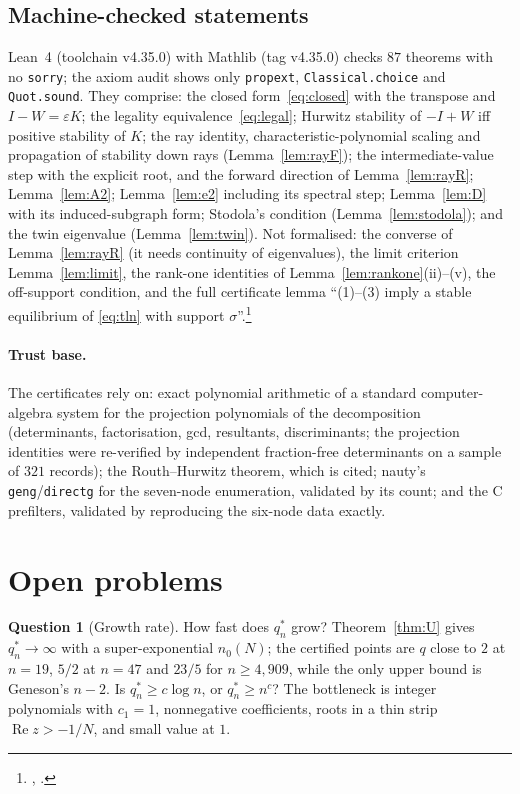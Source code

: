 \documentclass[11pt]{article}
\theoremstyle{definition}
\newtheorem{question}[theorem]{Question}
\newcommand{\eps}{\varepsilon}
\newcommand{\Rea}{\operatorname{Re}}
\begin{document}
\subsection{Machine-checked statements}
Lean~4 (toolchain v4.35.0) with Mathlib (tag v4.35.0) checks $87$ theorems with no \texttt{sorry}; the axiom audit shows only
\texttt{propext}, \texttt{Classical.choice} and \texttt{Quot.sound}. They comprise: the closed form~\eqref{eq:closed} with the
transpose and $I-W=\eps K$; the legality equivalence~\eqref{eq:legal}; Hurwitz stability of $-I+W$ iff positive stability of $K$;
the ray identity, characteristic-polynomial scaling and propagation of stability down rays (Lemma~\ref{lem:rayF}); the
intermediate-value step with the explicit root, and the forward direction of Lemma~\ref{lem:rayR}; Lemma~\ref{lem:A2};
Lemma~\ref{lem:e2} including its spectral step; Lemma~\ref{lem:D} with its induced-subgraph form; Stodola's condition
(Lemma~\ref{lem:stodola}); and the twin eigenvalue (Lemma~\ref{lem:twin}). Not formalised: the converse of Lemma~\ref{lem:rayR}
(it needs continuity of eigenvalues), the limit criterion Lemma~\ref{lem:limit}, the rank-one identities of
Lemma~\ref{lem:rankone}(ii)--(v), the off-support condition, and the full certificate lemma ``(1)--(3) imply a stable equilibrium of
\eqref{eq:tln} with support $\sigma$''.\footnote{, .}

\paragraph{Trust base.} The certificates rely on: exact polynomial arithmetic of a standard computer-algebra system for the projection polynomials of the
decomposition (determinants, factorisation, gcd, resultants, discriminants; the projection identities were re-verified by
independent fraction-free determinants on a sample of $321$ records); the Routh--Hurwitz theorem, which is cited; nauty's
\texttt{geng}/\texttt{directg} for the seven-node enumeration, validated by its count; and the C prefilters, validated by
reproducing the six-node data exactly.

\section{Open problems}\label{sec:open}

\begin{question}[Growth rate]\label{q:growth}
How fast does $q_n^*$ grow? Theorem~\ref{thm:U} gives $q_n^*\to\infty$ with a super-exponential $n_0(N)$; the certified points
are $q$ close to $2$ at $n=19$, $5/2$ at $n=47$ and $23/5$ for $n\ge4{,}909$, while the only upper bound is Geneson's $n-2$. Is
$q_n^*\ge c\log n$, or $q_n^*\ge n^c$? The bottleneck is integer polynomials with $c_1=1$, nonnegative coefficients, roots in a thin
strip $\Rea z>-1/N$, and small value at $1$.
\end{question}
\end{document}
